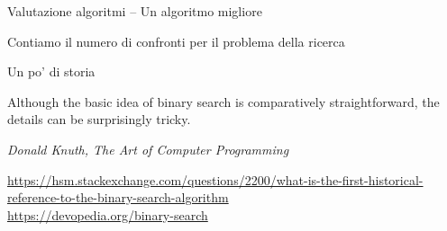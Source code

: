 \begin{frame}[shrink=10]{Valutazione algoritmi -- Un algoritmo migliore}

\vspace{-9pt}
\begin{mybox}
Contiamo il numero di confronti per il problema della \alert{ricerca}
\end{mybox}

\vspace{-12pt}

\end{frame}

\begin{frame}{Un po' di storia}
	

\setlength{}
\epigraph{\alert{Although the basic idea of binary search is comparatively straightforward, the details can be surprisingly tricky.}
}{\textit{Donald Knuth, The Art of Computer Programming}}

\tiny
\url{https://hsm.stackexchange.com/questions/2200/what-is-the-first-historical-reference-to-the-binary-search-algorithm}\\
\url{https://devopedia.org/binary-search}



\end{frame}

